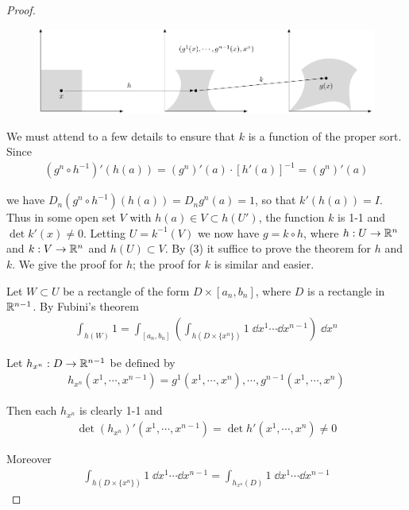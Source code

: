\begin{proof}
\clearpage
\begin{figure}[!htb]
    \centering
    \includegraphics[width=1.4\linewidth, angle=90]{./pics/Fig3-3.pdf}
    \caption{}
    \label{Fig 3-3}
\end{figure}

\clearpage
We must attend to a few details to ensure that $k$ is a function
of the proper sort. Since
\begin{align*}
    (g^n\circ h^{-1})'(h(a)) = (g^n)'(a) \cdot [h'(a)]^{-1} = (g^n)'(a)
\end{align*}

we have $D_n(g^n\circ h^{-1})(h(a)) = D_ng^n(a) = 1$, so that $k'(h(a))=I$. Thus 
in some open set $V$ with $h(a)\in V\subset h(U')$, the function $k$ is 1-1 and 
$\det k'(x)\neq 0$. Letting $U=k^{-1}(V)$ we now have $g=k\circ h$, where $h:U\to \mathbb{R}^n$
and $k:V\to \mathbb{R}^n$ and $h(U)\subset V$. By (3) it suffice to prove the theorem for $h$
and $k$. We give the proof for $h$; the proof for $k$ is similar and easier.

Let $W\subset U$ be a rectangle of the form $D\times [a_n,b_n]$, where $D$ is a rectangle in 
$\mathbb{R}^{n-1}$. By Fubini's theorem 
\begin{align*}
    \int_{h(W)} 1 = 
    \int_{[a_n, b_n]} \left(\int_{h(D\times \{x^n\})} 1\;\dd x^1\cdots \dd x^{n-1}\right)\;\dd x^n
\end{align*}

Let $h_{x^n}: D\to \mathbb{R}^{n-1}$ be defined by 
\begin{align*}
    h_{x^n}(x^1, \cdots, x^{n-1}) = g^1(x^1, \cdots, x^n),\cdots, g^{n-1}(x^1, \cdots, x^n)
\end{align*}

Then each $h_{x^n}$ is clearly 1-1 and 
\begin{align*}
    \det (h_{x^n})'(x^1, \cdots, x^{n-1}) 
    = 
    \det h'(x^1, \cdots, x^n) \neq 0
\end{align*}

Moreover 
\begin{align*}
    \int_{h(D\times \{x^n\})} 1\;\dd x^1\cdots \dd x^{n-1} 
    = 
    \int_{h_{x^n}(D)} 1\;\dd x^1\cdots \dd x^{n-1}
\end{align*}


\end{proof}
